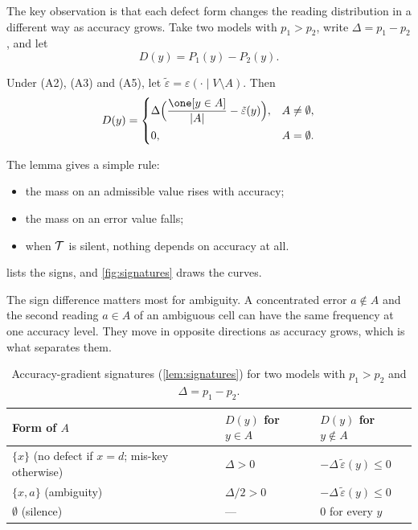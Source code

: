 The key observation is that each defect form changes the reading distribution in a different way as accuracy grows. Take two models with $p_1>p_2$, write $\Delta=p_1-p_2$, and let
\begin{equation}
\label{eq:contrast}
D(y)=P_1(y)-P_2(y).
\end{equation}

\begin{lemma}[Signatures]
\label{lem:signatures}
Under (A2), (A3) and (A5), let $\tilde\varepsilon=\varepsilon(\cdot\mid V\setminus A)$. Then
\begin{equation}
\label{eq:signature}
D(y)=
\begin{cases}
\Delta\Bigl(\dfrac{\one[y\in A]}{|A|}-\tilde\varepsilon(y)\Bigr), & A\neq\emptyset,\\[8pt]
0, & A=\emptyset .
\end{cases}
\end{equation}
\end{lemma}

The lemma gives a simple rule:
\begin{itemize}[leftmargin=*]
\item the mass on an admissible value rises with accuracy;
\item the mass on an error value falls;
\item when $\mathcal{T}$ is silent, nothing depends on accuracy at all.
\end{itemize}
 lists the signs, and \cref{fig:signatures} draws the curves.

The sign difference matters most for ambiguity. A concentrated error $a\notin A$ and the second reading $a\in A$ of an ambiguous cell can have the same frequency at one accuracy level. They move in opposite directions as accuracy grows, which is what separates them.

\begin{table}[t]
\caption{Accuracy-gradient signatures (\cref{lem:signatures}) for two models with $p_1>p_2$ and $\Delta=p_1-p_2$.}
\label{tab:signatures}
\small
\begin{tabular}{@{}lll@{}}
\toprule
Form of $A$ & $D(y)$ for $y\in A$ & $D(y)$ for $y\notin A$ \\
\midrule
$\{x\}$ (no defect if $x=d$; mis-key otherwise) & $\Delta>0$ & $-\Delta\,\tilde\varepsilon(y)\le0$ \\
$\{x,a\}$ (ambiguity) & $\Delta/2>0$ & $-\Delta\,\tilde\varepsilon(y)\le0$ \\
$\emptyset$ (silence) & --- & $0$ for every $y$ \\
\bottomrule
\end{tabular}
\end{table}

